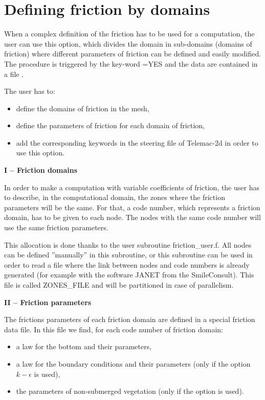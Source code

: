\chapter{Defining friction by domains}
\label{tel2d:app5}
 When a complex definition of the friction has to be used for a computation, the user can use this option, which divides the domain in sub-domains (domains of friction) where different parameters of friction can be defined and easily modified. The procedure is triggered by the key-word =YES and the data are contained in a file .

 The user has to:

\begin{itemize}
\item  define the domains of friction in the mesh,

\item  define the parameters of friction for each domain of friction,

\item  add the corresponding keywords in the steering file of Telemac-2d in order to use this option.
\end{itemize}

 \textbf{I -- Friction domains}

 In order to make a computation with variable coefficients of friction, the user has to describe, in the computational domain, the zones where the friction parameters will be the same. For that, a code number, which represents a friction domain, has to be given to each node. The nodes with the same code number will use the same friction parameters.

 This allocation is done thanks to the user subroutine friction\_user.f. All nodes can be defined ''manually'' in this subroutine, or this subroutine can be used in order to read a file where the link between nodes and code numbers is already generated (for example with the software JANET from the SmileConsult). This file is called ZONES\_FILE and will be partitioned in case of parallelism.

 \textbf{II -- Friction parameters}

 The frictions parameters of each friction domain are defined in a special friction data file. In this file we find, for each code number of friction domain:

\begin{itemize}
\item  a law for the bottom and their parameters,

\item  a law for the boundary conditions and their parameters (only if the option $k-\epsilon$ is used),

\item  the parameters of non-submerged vegetation (only if the option is used).
\end{itemize}

